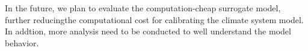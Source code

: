 \documentclass[gmd, manuscript]{copernicus}
\begin{document}
In the future, we plan to evaluate the computation-cheap surrogate model, further reducingthe computational cost for calibrating the climate system model. In addtion, more analysis need to be conducted to well understand the model behavior.
 
















\clearpage

\end{document}
